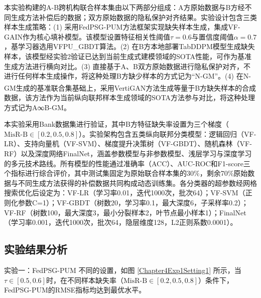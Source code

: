 本实验构建的A-B跨机构联合样本集由以下两部分组成：A方原始数据与B方经不同生成方法补偿后的数据；双方原始数据的隐私保护对齐结果。实验设计包含三类样本生成策略：(1) 采用FedPSG-PUM方法框架实现缺失样本生成，集成VF-GAIN作为核心填补模型。该模型设置特征相关性阈值$\tau=0.6$与置信度阈值$\alpha=0.7$，基学习器选用VFPU\_GBDT算法。(2) 在B方本地部署TabDDPM模型生成缺失样本，该模型经实验2验证已达到当前生成式建模领域的SOTA性能，可作为基准生成方法进行横向对比。(3) 直接基于A、B双方原始数据进行隐私保护对齐，不进行任何样本生成操作，将这种处理B方缺少样本的方式记为“N-GM”。(4) 在N-GM生成的基准联合集基础上，采用VertiGAN\textsuperscript{\cite{VertiGAN}}方法生成等量于B方缺失样本的合成数据，该方法作为当前纵向联邦样本生成领域的SOTA方法参与对比，将这种处理方式记为A∞B-GM。

本实验采用Bank数据集进行验证，其中B方特征缺失率设置为三个梯度（$\text{MisR-B} \in [0.2,0.5,0.8]$）。实验架构包含五类纵向联邦分类模型：逻辑回归（VF-LR）、支持向量机（VF-SVM）、梯度提升决策树（VF-GBDT）、随机森林（VF-RF）以及深度网络FinalNet，涵盖参数模型与非参数模型、浅层学习与深度学习的多元技术路线。所有模型的性能通过准确率（ACC）、AUC-ROC和F1-score三个指标进行综合评价，其中测试集固定为原始联合样本集的30\%，剩余70\%原始数据与不同生成方法获得的补偿数据共同构成动态训练集。各分类器的超参数经网格搜索优化后设定为：VF-LR（学习率0.01，迭代1000次，批次64）；VF-SVM（正则化参数C=1）；VF-GBDT（树数20，学习率0.1，最大深度6，子采样率0.2）；VF-RF（树数100，最大深度3，最小分裂样本2，叶节点最小样本1）；FinalNet（学习率0.001，迭代1000次，批次64，隐层维度128，L2正则系数0.0001）。


\subsection{实验结果分析}

实验一：FedPSG-PUM 不同的设置，如图 \ref{Chapter4Exp1Setting1} 所示，当$\tau \in [0.5,0.6]$时，在不同样本缺失率（$\text{MisR-B} \in [0.2,0.5,0.8]$）条件下，FedPSG-PUM的RMSE指标均达到最优水平。

